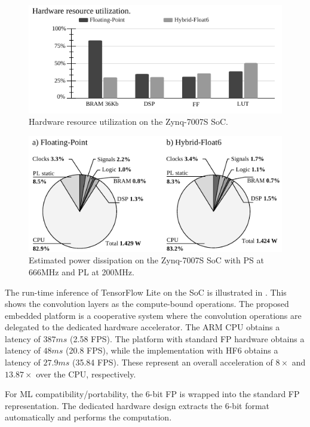 \begin{figure}[h!]
	\centering
	\includegraphics[width=1\columnwidth]{../figures/power_breakdown/resource_utilization.pdf}
	\caption{Hardware resource utilization on the Zynq-7007S SoC.}
	\label{fig:resource_utilization}
\end{figure}

\begin{figure}[h!]
	\centering
	\includegraphics[width=1\columnwidth]{../figures/power_breakdown/power_breakdown.pdf}
	\caption{Estimated power dissipation on the Zynq-7007S SoC with PS at 666MHz and PL at 200MHz.}
	\label{fig:power}
\end{figure}

The run-time inference of TensorFlow Lite on the SoC is illustrated in . This shows the convolution layers as the compute-bound operations. The proposed embedded platform is a cooperative system where the convolution operations are delegated to the dedicated hardware accelerator. The ARM CPU obtains a latency of $387ms$ (2.58 FPS). The platform with standard FP hardware obtains a latency of $48 ms$ (20.8 FPS), while the implementation with HF6 obtains a latency of $27.9 ms$ (35.84 FPS). These represent an overall acceleration of $8\times$ and $13.87\times$ over the CPU, respectively.

For ML compatibility/portability, the 6-bit FP is wrapped into the standard FP representation. The dedicated hardware design extracts the 6-bit format automatically and performs the computation.

